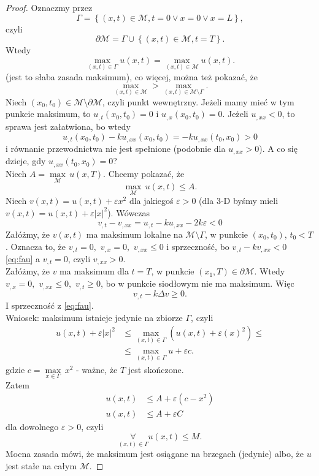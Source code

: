 \documentclass[../main.tex]{subfiles}
\begin{document}
		\begin{proof}
				Oznaczmy przez
				\[
						\Gamma = \left\{ (x,t)\in \mathcal{M}, t = 0 \lor x = 0 \lor x = L \right\}
				,\]
				czyli
				\[
						\partial \mathcal{M} = \Gamma \cup \left\{ (x,t)\in \mathcal{M}, t = T \right\}
				.\]
				Wtedy
				\[
						\underset{(x,t)\in \Gamma}{\max} u(x,t) = \underset{(x,t)\in \mathcal{M}}{\max} u(x,t)
				.\]
				(jest to słaba zasada maksimum), co więcej, można też pokazać, że
				\[
						\underset{(x,t)\in \mathcal{M}}{\max} > \underset{(x,t)\in \mathcal{M}\setminus \Gamma}{\max}
				.\]
				Niech $(x_0,t_0)\in \mathcal{M}\setminus\partial \mathcal{M}$, czyli punkt wewnętrzny. Jeżeli mamy mieć w tym punkcie maksimum, to $u_{,t}(x_0,t_0) = 0$ i $u_{,x}(x_0,t_0) = 0$. Jeżeli $u_{,x x}<0$, to sprawa jest załatwiona, bo wtedy
				\[
						u_{,t}(x_0,t_0) - k u_{,x x}(x_0,t_0) = -k u_{,x x}(t_0,x_0) > 0
				\]
				i równanie przewodnictwa nie jest spełnione (podobnie dla $u_{,x x}>0$). A co się dzieje, gdy $u_{,x x}(t_0,x_0) = 0$?\\
				Niech $A = \underset{\mathcal{M}}{\max}\, u(x,T)$. Chcemy pokazać, że
				\[
						\underset{\mathcal{M}}{\max}\, u(x,t) \le A
				.\]
				Niech $v(x,t) = u(x,t) + \varepsilon x^2$ dla jakiegoś $\varepsilon>0$ (dla 3-D byśmy mieli $v(x,t) =u(x,t) + \varepsilon|x|^2$). Wówczas
				\begin{equation}
						\label{eq:fau}
				v_{,t} - v_{,x x} = u_{,t} - ku_{,x x} - 2k\varepsilon < 0
				\end{equation}
				Załóżmy, że $v(x,t)$ ma maksimum lokalne na $\mathcal{M}\setminus\Gamma$, w punkcie $(x_0,t_0)$, $t_0<T$. Oznacza to, że $v_{,t} = 0,$ $v_{,x} = 0,$ $v_{,x x}\le 0$ i sprzeczność, bo $v_{,t} - k v_{,x x} < 0$ \eqref{eq:fau} a $v_{,t} = 0$, czyli $v_{,x x} > 0$.\\

				Załóżmy, że $v$ ma maksimum dla $t = T$, w punkcie $(x_1,T)\in \partial \mathcal{M}$. Wtedy $v_{,x}=0,$ $v_{,x x}\le 0,$ $v_{,t}\ge 0$, bo w punkcie siodłowym nie ma maksimum. Więc
				\[
				v_{,t} - k\Delta v \ge 0
				.\]
				I sprzeczność z \eqref{eq:fau}.\\

				Wniosek: maksimum istnieje jedynie na zbiorze $\Gamma$, czyli
				\begin{align*}
						u(x,t) + \varepsilon|x|^2 &\le \underset{(x,t)\in \Gamma}{\max} (u(x,t) + \varepsilon(x)^2) \le \\
						&\le \underset{(x,t)\in \Gamma}{\max} u + \varepsilon c
				.\end{align*}
				gdzie $c = \underset{x\in \Gamma}{\max}\, x^2$ - ważne, że $T$ jest skończone.\\ Zatem
				\begin{align*}
						u(x,t) &\le A+\varepsilon(c-x^2)\\
						u(x,t) &\le A+\varepsilon C
				\end{align*}
				dla dowolnego $\varepsilon>0$,
				czyli
				\[
						\underset{(x,t)\in \Gamma}{\forall} u(x,t) \le M
				.\]
				Mocna zasada mówi, że maksimum jest osiągane na brzegach (jedynie) albo, że $u$ jest stałe na całym $\mathcal{M}$.
		\end{proof}
\end{document}
